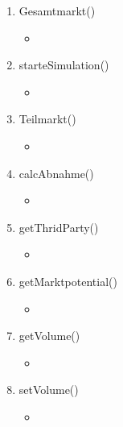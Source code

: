 \begin{enumerate}
	\item Gesamtmarkt() 
	\begin{itemize}
	\item	
	\end{itemize}
	\item starteSimulation() 
	\begin{itemize}
	\item 	
	\end{itemize}
	\item Teilmarkt()
	\begin{itemize}
	\item 	
	\end{itemize}
	\item calcAbnahme() 
	\begin{itemize}
	\item 	
	\end{itemize}
	\item getThridParty() 
	\begin{itemize}
	\item 	
	\end{itemize}
	\item getMarktpotential() 
	\begin{itemize}
	\item 	
	\end{itemize}
	\item getVolume() 
	\begin{itemize}
	\item 	
	\end{itemize}
	\item setVolume() 
	\begin{itemize}
	\item 	
	\end{itemize}
\end{enumerate}




